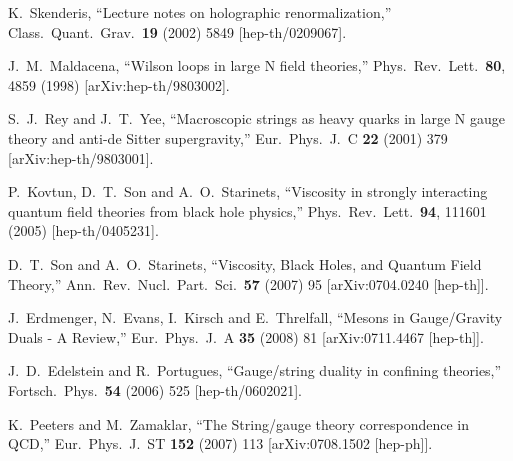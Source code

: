 \documentclass[12pt,notitlepage,a4paper]{article}
\begin{document}
\begin{thebibliography}{99.}
  
  
  K.~Skenderis,
  ``Lecture notes on holographic renormalization,''
  Class.\ Quant.\ Grav.\  {\bf 19} (2002) 5849
  [hep-th/0209067].

  J.~M.~Maldacena,
  ``Wilson loops in large N field theories,''
  Phys.\ Rev.\ Lett.\  {\bf 80}, 4859 (1998)
  [arXiv:hep-th/9803002].


  S.~J.~Rey and J.~T.~Yee,
  ``Macroscopic strings as heavy quarks in large N gauge theory and  anti-de
  Sitter supergravity,''
  Eur.\ Phys.\ J.\  C {\bf 22} (2001) 379
  [arXiv:hep-th/9803001].


 
  P.~Kovtun, D.~T.~Son and A.~O.~Starinets,
  ``Viscosity in strongly interacting quantum field theories from black hole physics,''
  Phys.\ Rev.\ Lett.\  {\bf 94}, 111601 (2005)
  [hep-th/0405231].
 
 
 
 
 
 
  D.~T.~Son and A.~O.~Starinets,
  ``Viscosity, Black Holes, and Quantum Field Theory,''
  Ann.\ Rev.\ Nucl.\ Part.\ Sci.\  {\bf 57} (2007) 95
  [arXiv:0704.0240 [hep-th]].
 
 
 
 
  J.~Erdmenger, N.~Evans, I.~Kirsch and E.~Threlfall,
  ``Mesons in Gauge/Gravity Duals - A Review,''
  Eur.\ Phys.\ J.\ A {\bf 35} (2008) 81
  [arXiv:0711.4467 [hep-th]].

 
 
  J.~D.~Edelstein and R.~Portugues,
  ``Gauge/string duality in confining theories,''
  Fortsch.\ Phys.\  {\bf 54} (2006) 525
  [hep-th/0602021].
 
 
 
 
  K.~Peeters and M.~Zamaklar,
  ``The String/gauge theory correspondence in QCD,''
  Eur.\ Phys.\ J.\ ST {\bf 152} (2007) 113
  [arXiv:0708.1502 [hep-ph]].
 




\end{thebibliography}
\end{document}
